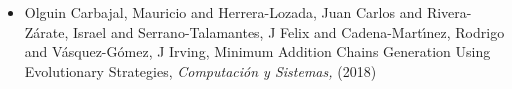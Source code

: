 \begin{itemize} 
\item Olguin Carbajal, Mauricio and Herrera-Lozada, Juan Carlos and Rivera-Z{\'a}rate, Israel and Serrano-Talamantes, J Felix and Cadena-Mart{\'\i}nez, Rodrigo and V{\'a}squez-G{\'o}mez, J Irving, Minimum Addition Chains Generation Using Evolutionary Strategies,\textit{ Computaci{\'o}n y Sistemas,} (2018) 
\end{itemize} 
